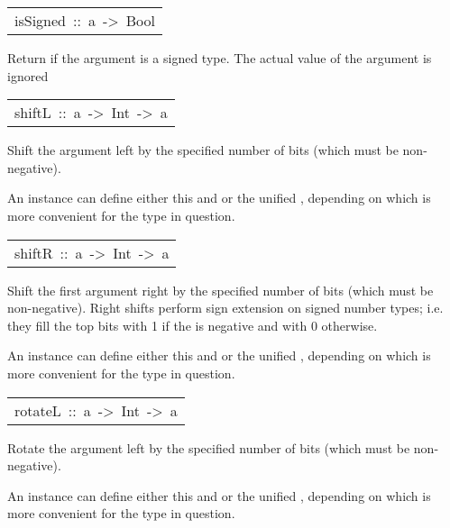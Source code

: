\begin{haddockdesc}
\begin{haddockdesc}
\end{haddockdesc}
\begin{haddockdesc}
\item[\begin{tabular}{@{}l}
isSigned\ ::\ a\ ->\ Bool
\end{tabular}]\haddockbegindoc
Return  if the argument is a signed type.  The actual
        value of the argument is ignored 
\par

\end{haddockdesc}
\begin{haddockdesc}
\item[\begin{tabular}{@{}l}
shiftL\ ::\ a\ ->\ Int\ ->\ a
\end{tabular}]\haddockbegindoc
Shift the argument left by the specified number of bits
        (which must be non-negative).
\par
An instance can define either this and  or the unified
        , depending on which is more convenient for the type in
        question. 
\par

\end{haddockdesc}
\begin{haddockdesc}
\item[\begin{tabular}{@{}l}
shiftR\ ::\ a\ ->\ Int\ ->\ a
\end{tabular}]\haddockbegindoc
Shift the first argument right by the specified number of bits
        (which must be non-negative).
        Right shifts perform sign extension on signed number types;
        i.e. they fill the top bits with 1 if the  is negative
        and with 0 otherwise.
\par
An instance can define either this and  or the unified
        , depending on which is more convenient for the type in
        question. 
\par

\end{haddockdesc}
\begin{haddockdesc}
\item[\begin{tabular}{@{}l}
rotateL\ ::\ a\ ->\ Int\ ->\ a
\end{tabular}]\haddockbegindoc
Rotate the argument left by the specified number of bits
        (which must be non-negative).
\par
An instance can define either this and  or the unified
        , depending on which is more convenient for the type in
        question. 
\par


\end{haddockdesc}
\end{haddockdesc}
